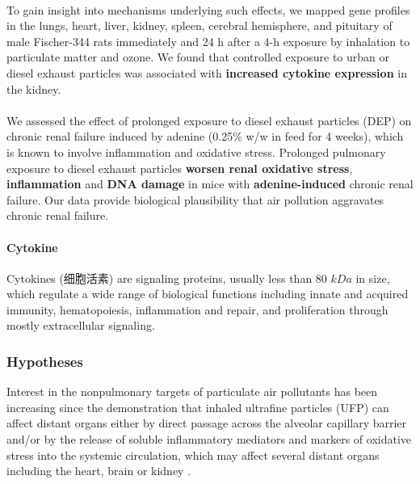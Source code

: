 \documentclass[11pt]{article}
\begin{document}
\paragraph{\citet{thomson2013mapping}} To gain insight into mechanisms underlying such effects, we mapped gene profiles in the lungs, heart, liver, kidney, spleen, cerebral hemisphere, and pituitary of male Fischer-344 rats immediately and 24 h after a 4-h exposure by inhalation to particulate matter and ozone. We found that controlled exposure to urban or diesel exhaust particles was associated with \textbf{increased cytokine expression} in the kidney.

\paragraph{\citet{nemmar2016prolonged}} We assessed the effect of prolonged exposure to diesel exhaust particles (DEP) on chronic renal failure induced by adenine (0.25\% w/w in feed for 4 weeks), which is known to involve inflammation and oxidative stress. Prolonged pulmonary exposure to diesel exhaust particles \textbf{worsen renal oxidative stress}, \textbf{inflammation} and \textbf{DNA damage} in mice with \textbf{adenine-induced} chronic renal failure. Our data provide biological plausibility that air pollution aggravates chronic renal failure.

\paragraph{Cytokine} Cytokines (细胞活素) are signaling proteins, usually less than 80 $kDa$ in size, which regulate a wide range of biological functions including innate and acquired immunity, hematopoiesis, inflammation and repair, and proliferation through mostly extracellular signaling. 

\subsubsection{Hypotheses}

Interest in the nonpulmonary targets of particulate air pollutants has been increasing since the demonstration that inhaled ultrafine particles (UFP) can affect distant organs either by direct passage across the alveolar capillary barrier and/or by the release of soluble inflammatory mediators and markers of oxidative stress into the systemic circulation, which may affect several distant organs including the heart, brain or kidney \citep{nemmar2013recent, nemmar2004possible, oberdorster2005nanotoxicology, peters2006translocation, vermylen2005ambient}. 
\end{document}
